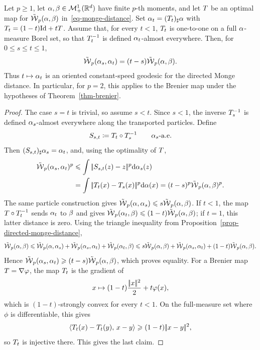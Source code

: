 \begin{prop}\label{prop-monge-displacement-geodesic}
	Let $p\geq1$, let $\alpha,\beta\in\mathcal{M}_+^1(\mathbb{R}^d)$ have finite $p$-th moments, and let $T$ be an optimal map for $\tilde{\operatorname{\mathcal{W}}}_p(\alpha,\beta)$ in~\eqref{eq-monge-distance}. Set $\alpha_t=(T_t)_\sharp\alpha$ with $T_t=(1-t)\mathrm{Id}+tT$. Assume that, for every $t<1$, $T_t$ is one-to-one on a full $\alpha$-measure Borel set, so that $T_t^{-1}$ is defined $\alpha_t$-almost everywhere. Then, for $0\leq s\leq t\leq1$,
	\[
		\tilde{\operatorname{\mathcal{W}}}_p(\alpha_s,\alpha_t)=(t-s)\tilde{\operatorname{\mathcal{W}}}_p(\alpha,\beta).
	\]
	Thus $t\mapsto\alpha_t$ is an oriented constant-speed geodesic for the directed Monge distance. In particular, for $p=2$, this applies to the Brenier map under the hypotheses of Theorem~\ref{thm-brenier}.
\end{prop}
\begin{proof}
	The case $s=t$ is trivial, so assume $s<t$. Since $s<1$, the inverse $T_s^{-1}$ is defined $\alpha_s$-almost everywhere along the transported particles. Define
	\[
		S_{s,t}\coloneqq T_t\circ T_s^{-1}
		\qquad \alpha_s\text{-a.e.}
	\]
	Then $(S_{s,t})_\sharp\alpha_s=\alpha_t$, and, using the optimality of $T$,
	\[
	\begin{aligned}
		\tilde{\operatorname{\mathcal{W}}}_p(\alpha_s,\alpha_t)^p
		&\leqslant
		\int |\!| S_{s,t}(z)-z |\!|^p\mathrm{d}\alpha_s(z) \\
		&=
		\int |\!| T_t(x)-T_s(x) |\!|^p\mathrm{d}\alpha(x)
		=
		(t-s)^p\tilde{\operatorname{\mathcal{W}}}_p(\alpha,\beta)^p.
	\end{aligned}
	\]
	The same particle construction gives $\tilde{\operatorname{\mathcal{W}}}_p(\alpha,\alpha_s)\leqslant s\tilde{\operatorname{\mathcal{W}}}_p(\alpha,\beta)$. If $t<1$, the map $T\circ T_t^{-1}$ sends $\alpha_t$ to $\beta$ and gives $\tilde{\operatorname{\mathcal{W}}}_p(\alpha_t,\beta)\leqslant(1-t)\tilde{\operatorname{\mathcal{W}}}_p(\alpha,\beta)$; if $t=1$, this latter distance is zero. Using the triangle inequality from Proposition~\ref{prop-directed-monge-distance},
	\[
		\tilde{\operatorname{\mathcal{W}}}_p(\alpha,\beta)
		\leqslant
		\tilde{\operatorname{\mathcal{W}}}_p(\alpha,\alpha_s)+\tilde{\operatorname{\mathcal{W}}}_p(\alpha_s,\alpha_t)+\tilde{\operatorname{\mathcal{W}}}_p(\alpha_t,\beta)
		\leqslant
		s\tilde{\operatorname{\mathcal{W}}}_p(\alpha,\beta)+\tilde{\operatorname{\mathcal{W}}}_p(\alpha_s,\alpha_t)+(1-t)\tilde{\operatorname{\mathcal{W}}}_p(\alpha,\beta).
	\]
	Hence $\tilde{\operatorname{\mathcal{W}}}_p(\alpha_s,\alpha_t)\geqslant(t-s)\tilde{\operatorname{\mathcal{W}}}_p(\alpha,\beta)$, which proves equality. For a Brenier map $T=\nabla\varphi$, the map $T_t$ is the gradient of
	\[
		x\mapsto (1-t)\frac{|\!| x |\!|^2}{2}+t\varphi(x),
	\]
	which is $(1-t)$-strongly convex for every $t<1$. On the full-measure set where $\phi$ is differentiable, this gives
	\[
		\langle T_t(x)-T_t(y),\,x-y\rangle\geqslant(1-t)|\!| x-y |\!|^2,
	\]
	so $T_t$ is injective there. This gives the last claim.
\end{proof}

